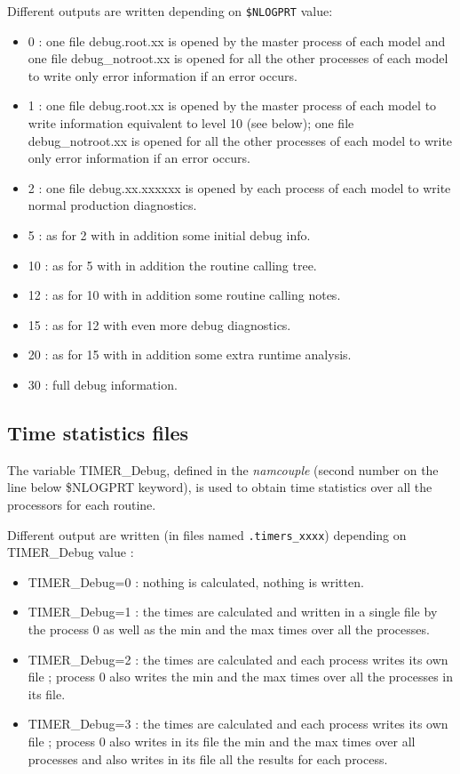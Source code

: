 Different outputs are written depending on {\tt \$NLOGPRT} value:
\begin{itemize}
\item {0} : one file debug.root.xx is opened by the master process of
  each model and one file debug\_notroot.xx is opened for all the other
  processes of each model to write only error information if an error
  occurs.
\item {1} : one file debug.root.xx is opened by the master process of
  each model to write information equivalent to level 10 (see below);
  one file debug\_notroot.xx is opened for all the other processes of
  each model to write only error information if an error occurs.
\item {2} : one file debug.xx.xxxxxx is opened by each process of each
  model to write normal production diagnostics.
\item {5} : as for 2 with in addition some initial debug info.
\item {10} : as for 5 with in addition the routine calling tree.
\item {12} : as for 10 with in addition some routine calling notes.
\item {15} : as for 12 with even more debug diagnostics.
\item {20} : as for 15 with in addition some extra runtime analysis.
\item {30} : full debug information.
\end{itemize}

\subsection{Time statistics files}
\label{timestat}

The variable TIMER\_Debug, defined in the {\it namcouple} (second
number on the line below \$NLOGPRT keyword), is used to obtain time
statistics over all the processors for each routine.

Different output are written (in files named {\tt *.timers\_xxxx})
depending on TIMER\_Debug value :

\begin{itemize}
\item {TIMER\_Debug=0} : nothing is calculated, nothing is written.
\item {TIMER\_Debug=1} : the times are calculated and written in a
  single file by the process 0 as well as the min and the max times
  over all the processes.
\item {TIMER\_Debug=2} : the times are calculated and each process
  writes its own file ; process 0 also writes the min and the max
  times over all the processes in its file.
\item {TIMER\_Debug=3} : the times are calculated and each process
  writes its own file ; process 0 also writes in its file the min
  and the max times over all processes and also writes in its file
  all the results for each process.
\end{itemize}

